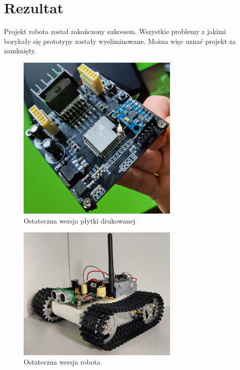\documentclass[10pt, a4paper]{article}
\begin{document}
\section{Rezultat}
Projekt robota został zakończony sukcesem. Wszystkie problemy z jakimi borykały
się prototypy zostały wyeliminowane. Można więc uznać projekt za zamknięty.  

\begin{figure}[H]
	\centering
	\includegraphics[width=0.7\textwidth]{figures/final/pcb.jpg}
	\caption{Ostateczna wersja płytki drukowanej}
	\label{fig:pcb_final}
\end{figure}

\begin{figure}[H]
	\centering
	\includegraphics[width=0.7\textwidth]{figures/final/robot1.jpg}
	\caption{Ostateczna wersja robota}
	\label{fig:robot_final1}
\end{figure}
\end{document}
